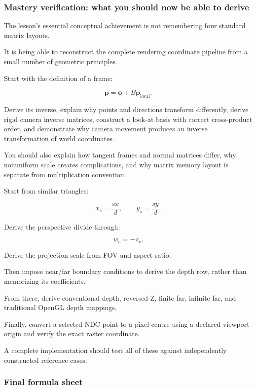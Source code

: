 \subsubsection{Mastery verification: what you should now be able to derive}\label{mastery-verification-what-you-should-now-be-able-to-derive}

The lesson's essential conceptual achievement is not remembering four standard matrix layouts.

It is being able to reconstruct the complete rendering coordinate pipeline from a small number of geometric principles.

Start with the definition of a frame:

\[
 \mathbf p=\mathbf o+B\mathbf p_{\mathrm{local}}.
\]

Derive its inverse, explain why points and directions transform differently, derive rigid camera inverse matrices, construct a look-at basis with correct cross-product order, and demonstrate why camera movement produces an inverse transformation of world coordinates.

You should also explain how tangent frames and normal matrices differ, why nonuniform scale creates complications, and why matrix memory layout is separate from multiplication convention.

Start from similar triangles:

\[
 x_s=\frac{sx}{d}, \qquad y_s=\frac{sy}{d}.
\]

Derive the perspective divide through:

\[
 w_c=-z_v.
\]

Derive the projection scale from FOV and aspect ratio.

Then impose near/far boundary conditions to derive the depth row, rather than memorizing its coefficients.

From there, derive conventional depth, reversed-Z, finite far, infinite far, and traditional OpenGL depth mappings.

Finally, convert a selected NDC point to a pixel centre using a declared viewport origin and verify the exact raster coordinate.

A complete implementation should test all of these against independently constructed reference cases.

\subsubsection{Final formula sheet}\label{final-formula-sheet}

